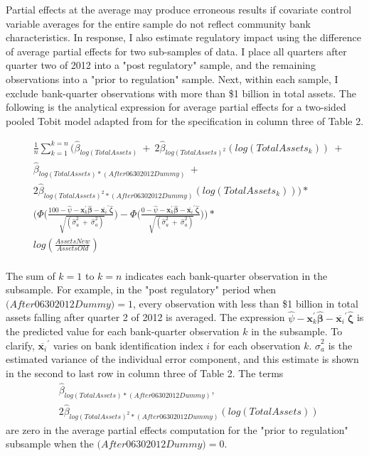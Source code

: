 \documentclass[preprint,12pt]{elsarticle}
\begin{document}
Partial effects at the average may produce erroneous results if covariate control variable averages for the entire sample do not reflect community bank characteristics.  In response, I also estimate regulatory impact using the difference of average partial effects for two sub-samples of data.  I place all quarters after quarter two of 2012 into a "post regulatory" sample, and the remaining observations into a "prior to regulation" sample.  Next, within each sample, I exclude bank-quarter observations with more than \$1 billion in total assets. The following is the analytical expression for average partial effects for a two-sided pooled Tobit model adapted from \cite{Wooldridge2010,Wooldridge2013} for the specification in column three of Table 2.

\begin{align*}
& \frac{1}{n} \sum_{k=1}^{k=n} \bigg( \hat{\beta}_{log(TotalAssets)} \ + \ 2\hat{\beta}_{log(TotalAssets)^{2}}(log(TotalAssets_{k})) \ +\\ 
& \hat{\beta}_{log(TotalAssets)*(After06302012Dummy)} \ + \\ 
& 2\hat{\beta}_{log(TotalAssets)^{2}*(After06302012Dummy)}(log(TotalAssets_{k}))\bigg) * \\ 
& \bigg( \Phi \Big(\frac{100 -  \hat{\psi} - \bm{x}_{k}^{'}\hat{\bm{\beta}} - \overline{\bm{x}_{i}}^{'}\hat{\bm{\zeta}}}{\sqrt[]{(\hat{\sigma}_{u}^{2} \ + \ \hat{\sigma}_{a}^{2})}} \Big) -  \Phi \Big(\frac{0 -  \hat{\psi} - \bm{x}_{k}^{'}\hat{\bm{\beta}} - \overline{\bm{x}_{i}}^{'}\hat{\bm{\zeta}}}{\sqrt[]{(\hat{\sigma}_{u}^{2} \ + \ \hat{\sigma}_{a}^{2})}} \Big) \bigg) * \\
& log(\frac{AssetsNew}{AssetsOld}) \\ 
&
\end{align*}

The sum of $k=1$ to $k=n$ indicates each bank-quarter observation in the subsample.  For example, in the "post regulatory" period when \\ $(After$$06302012$$Dummy)=1$, every observation with less than \$1 billion in total assets falling after quarter 2 of 2012 is averaged.  The expression $ \hat{\psi} - \bm{x}_{k}^{'}\hat{\bm{\beta}} - \overline{\bm{x}_{i}}^{'}\hat{\bm{\zeta}}$ is the predicted value for each bank-quarter observation $k$ in the subsample.  To clarify, $ \overline{\bm{x}_{i}}^{'}$ varies on bank identification index $i$ for each observation $k$.  $\hat{\sigma}_{a}^{2}$ is the estimated variance of the individual error component, and this estimate is shown in the second to last row in column three of Table 2.  The terms 
\begin{align*}
&\hat{\beta}_{log(TotalAssets)*(After06302012Dummy)}, \\ 
&2\hat{\beta}_{log(TotalAssets)^{2}*(After06302012Dummy)}(log(TotalAssets))
\end{align*}
are zero in the average partial effects computation for the "prior to regulation" subsample when the $(After$$06302012$$Dummy)=0$. 
\end{document}
